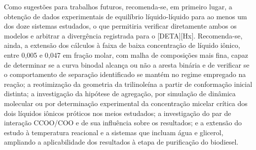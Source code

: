 Como sugestões para trabalhos futuros, recomenda-se, em primeiro lugar, a obtenção de dados experimentais de equilíbrio líquido-líquido para ao menos um dos doze sistemas estudados, o que permitiria verificar diretamente ambos os modelos e arbitrar a divergência registrada para o [DETA][Hx]. Recomenda-se, ainda, a extensão dos cálculos à faixa de baixa concentração de líquido iônico, entre 0,005 e 0,047 em fração molar, com malha de composições mais fina, capaz de determinar se a curva binodal alcança ou não a aresta binária e de verificar se o comportamento de separação identificado se mantém no regime empregado na reação; a reotimização da geometria da trilinoleína a partir de conformação inicial distinta; a investigação da hipótese de agregação, por simulação de dinâmica molecular ou por determinação experimental da concentração micelar crítica dos dois líquidos iônicos próticos nos meios estudados; a investigação do par de interação CCOO/COO e de sua influência sobre os resultados; e a extensão do estudo à temperatura reacional e a sistemas que incluam água e glicerol, ampliando a aplicabilidade dos resultados à etapa de purificação do biodiesel.